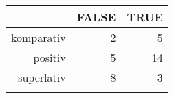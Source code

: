 \begin{tabular}{rrr}
  \lsptoprule
 & FALSE & TRUE \\ 
  \midrule
komparativ & 2 & 5 \\ 
  positiv & 5 & 14 \\ 
  superlativ & 8 & 3 \\ 
   \lspbottomrule
\end{tabular}

